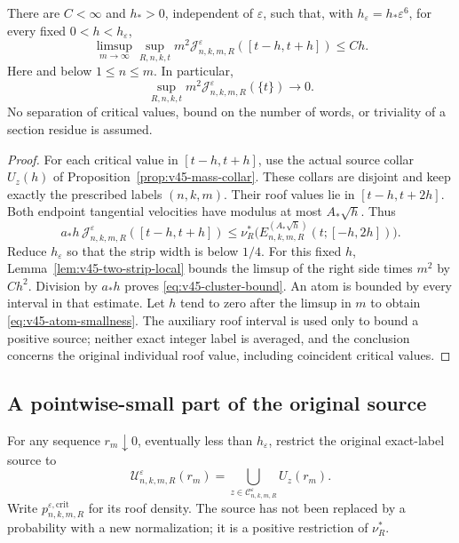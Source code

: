 \begin{theorem}
\label{thm:v45-critical-cluster}
There are $C<\infty$ and $h_*>0$, independent of $\varepsilon$,
such that, with $h_\varepsilon=h_*\varepsilon^6$, for every fixed
$0<h<h_\varepsilon$,
\begin{equation}\label{eq:v45-cluster-bound}
 \limsup_{m\to\infty}\sup_{R,n,k,t}
    m^2\mathcal J^\varepsilon_{n,k,m,R}([t-h,t+h])
                                      \le C h.
\end{equation}
Here and below $1\le n\le m$. In particular,
\begin{equation}\label{eq:v45-atom-smallness}
 \sup_{R,n,k,t}m^2\mathcal J^\varepsilon_{n,k,m,R}(\{t\})
                              \longrightarrow0.
\end{equation}
No separation of critical values, bound on the number of words, or
triviality of a section residue is assumed.
\end{theorem}
\begin{proof}
For each critical value in $[t-h,t+h]$, use the actual source collar
$U_z(h)$ of Proposition~\ref{prop:v45-mass-collar}. These collars are
disjoint and keep exactly the prescribed labels $(n,k,m)$. Their roof
values lie in $[t-h,t+2h]$. Both endpoint tangential velocities have
modulus at most $A_*\sqrt h$. Thus
\begin{equation}\label{eq:v45-positive-collar-comparison}
 a_* h\,
       \mathcal J^\varepsilon_{n,k,m,R}([t-h,t+h])
 \le\nu_R^*\bigl(E^{(A_*\sqrt h)}_{n,k,m,R}
                                  (t;[-h,2h])\bigr).
\end{equation}
Reduce $h_\varepsilon$ so that the strip width is below $1/4$.
For this fixed $h$, Lemma~\ref{lem:v45-two-strip-local} bounds the
limsup of the right side times $m^2$ by $C h^2$.
Division by $a_* h$ proves \eqref{eq:v45-cluster-bound}.
An atom is bounded by every interval in that estimate. Let $h$ tend
to zero after the limsup in $m$ to obtain
\eqref{eq:v45-atom-smallness}. The auxiliary roof interval is used
only to bound a positive source; neither exact integer label is
averaged, and the conclusion concerns the original individual roof
value, including coincident critical values.
\end{proof}

\subsection{A pointwise-small part of the original source}
For any sequence $r_m\downarrow0$, eventually less than
$h_\varepsilon$, restrict the original exact-label source to
\[
 \mathcal U^\varepsilon_{n,k,m,R}(r_m)
       =\bigcup_{z\in\mathcal C^\varepsilon_{n,k,m,R}}U_z(r_m).
\]
Write $p^{\varepsilon,\mathrm{crit}}_{n,k,m,R}$ for its roof density.
The source has not been replaced by a probability with a new
normalization; it is a positive restriction of $\nu_R^*$.

